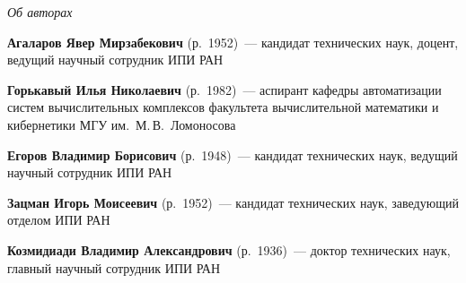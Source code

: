 \begin{center}\LARGE
\textit{Об авторах}
\end{center}
\thispagestyle{empty}

\vspace*{24pt}

\begin{multicols}{2}

\noindent
\textbf{Агаларов Явер Мирзабекович} (р.\ 1952)~---  кандидат технических наук,
доцент, ведущий научный сотрудник ИПИ РАН

\medskip%




\noindent
\textbf{Горькавый Илья Николаевич} (р.\ 1982)~--- аспирант кафедры автоматизации
сис\-тем вычислительных комплексов факультета вычислительной
математики и кибернетики МГУ им.\ М.\,В.~Ломоносова

\medskip%

\noindent %
\textbf{Егоров Владимир Борисович} (р.\ 1948)~---  кандидат технических наук,
ведущий научный сотрудник   ИПИ РАН

\medskip%

\noindent
\textbf{Зацман Игорь Моисеевич} (р.\ 1952)~---   кандидат технических наук, 
заведующий отделом ИПИ РАН

\medskip%



\noindent
\textbf{Козмидиади Владимир Александрович} (р.\ 1936)~--- 
доктор технических наук, главный научный сотрудник ИПИ РАН


\medskip%


\end{multicols}

